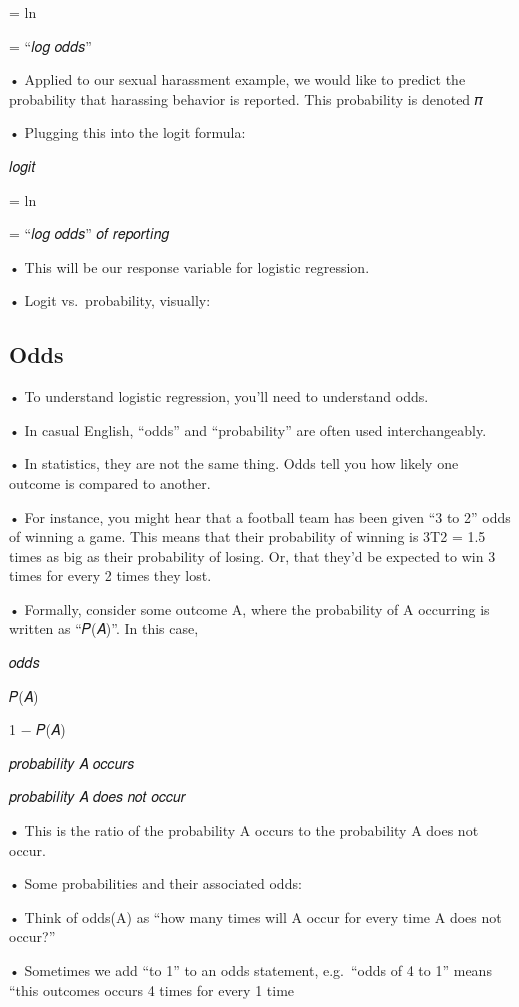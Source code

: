 \documentclass[
  letterpaper,
  DIV=11,
  numbers=noendperiod]{scrreprt}
\begin{document}
= ln

= ``𝑙𝑜𝑔 𝑜𝑑𝑑𝑠''

• Applied to our sexual harassment example, we would like to predict the
probability that harassing behavior is reported. This probability is
denoted 𝜋

• Plugging this into the logit formula:

𝑙𝑜𝑔𝑖𝑡

= ln

= ``𝑙𝑜𝑔 𝑜𝑑𝑑𝑠'' 𝑜𝑓 𝑟𝑒𝑝𝑜𝑟𝑡𝑖𝑛𝑔

• This will be our response variable for logistic regression.

• Logit vs.~probability, visually:

\hypertarget{odds}{%
\subsection{Odds}\label{odds}}

• To understand logistic regression, you'll need to understand odds.

• In casual English, ``odds'' and ``probability'' are often used
interchangeably.

• In statistics, they are not the same thing. Odds tell you how likely
one outcome is compared to another.

• For instance, you might hear that a football team has been given ``3
to 2'' odds of winning a game. This means that their probability of
winning is 3Τ2 = 1.5 times as big as their probability of losing. Or,
that they'd be expected to win 3 times for every 2 times they lost.

• Formally, consider some outcome A, where the probability of A
occurring is written as ``𝑃(𝐴)''. In this case,

𝑜𝑑𝑑𝑠

𝑃(𝐴)

1 − 𝑃(𝐴)

𝑝𝑟𝑜𝑏𝑎𝑏𝑖𝑙𝑖𝑡𝑦 𝐴 𝑜𝑐𝑐𝑢𝑟𝑠

𝑝𝑟𝑜𝑏𝑎𝑏𝑖𝑙𝑖𝑡𝑦 𝐴 𝑑𝑜𝑒𝑠 𝑛𝑜𝑡 𝑜𝑐𝑐𝑢𝑟

• This is the ratio of the probability A occurs to the probability A
does not occur.

• Some probabilities and their associated odds:

• Think of odds(A) as ``how many times will A occur for every time A
does not occur?''

• Sometimes we add ``to 1'' to an odds statement, e.g.~``odds of 4 to
1'' means ``this outcomes occurs 4 times for every 1 time
\end{document}
